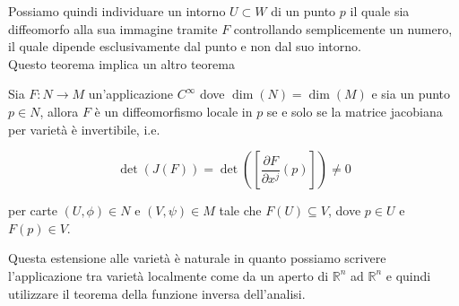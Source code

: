 Possiamo quindi individuare un intorno $ U \subset W $ di un punto $ p $ il quale sia diffeomorfo alla sua immagine tramite $ F $ controllando semplicemente un numero, il quale dipende esclusivamente dal punto e non dal suo intorno.\\
Questo teorema implica un altro teorema

\begin{theorem}\label{ift}
	Sia $ F : N \to M $ un'applicazione $ C^{\infty} $ dove $ \dim(N) = \dim(M) $ e sia un punto $ p \in N $, allora $ F $ è un diffeomorfismo locale in $ p $ se e solo se la matrice jacobiana per varietà è invertibile, i.e.
	
	\begin{equation}
		\det(J(F)) = \det( \left[ \dfrac{\partial F}{\partial x^{j}} (p) \right] ) \neq 0
	\end{equation}
	
	per carte $ (U,\phi) \in N $ e $ (V,\psi) \in M $ tale che $ F(U) \subseteq V $, dove $ p \in U $ e $ F(p) \in V $.
\end{theorem}

Questa estensione alle varietà è naturale in quanto possiamo scrivere l'applicazione tra varietà localmente come da un aperto di $ \mathbb{R}^{n} $ ad $ \mathbb{R}^{n} $ e quindi utilizzare il teorema della funzione inversa dell'analisi.

